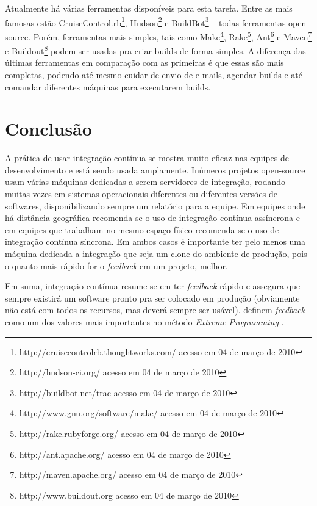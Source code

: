\documentclass[10pt,a4paper,font=plain]{abnt}
\begin{document}
Atualmente há várias ferramentas disponíveis para esta tarefa. Entre as mais famosas estão CruiseControl.rb\footnote{http://cruisecontrolrb.thoughtworks.com/ acesso em 04 de março de 2010}, Hudson\footnote{http://hudson-ci.org/ acesso em 04 de março de 2010} e BuildBot\footnote{http://buildbot.net/trac acesso em 04 de março de 2010} -- todas ferramentas open-source. Porém, ferramentas mais simples, tais como Make\footnote{http://www.gnu.org/software/make/ acesso em 04 de março de 2010}, Rake\footnote{ http://rake.rubyforge.org/ acesso em 04 de março de 2010}, Ant\footnote{http://ant.apache.org/ acesso em 04 de março de 2010} e Maven\footnote{http://maven.apache.org/ acesso em 04 de março de 2010} e Buildout\footnote{http://www.buildout.org acesso em 04 de março de 2010} podem ser usadas pra criar builds de forma simples. A diferença das últimas ferramentas em comparação com as primeiras é que essas são mais completas, podendo até mesmo cuidar de envio de e-mails, agendar builds e até comandar diferentes máquinas para executarem builds.

\section{Conclusão}

A prática de usar integração contínua se mostra muito eficaz nas equipes de desenvolvimento e está sendo usada amplamente. Inúmeros projetos open-source usam várias máquinas dedicadas a serem servidores de integração, rodando muitas vezes em sistemas operacionais diferentes ou diferentes versões de softwares, disponibilizando sempre um relatório para a equipe. Em equipes onde há distância geográfica recomenda-se o uso de integração contínua assíncrona e em equipes que trabalham no mesmo espaço físico recomenda-se o uso de integração contínua síncrona. Em ambos casos é importante ter pelo menos uma máquina dedicada a integração que seja um clone do ambiente de produção, pois o quanto mais rápido for o \textit{feedback} em um projeto, melhor.

Em suma, integração contínua resume-se em ter \textit{feedback} rápido e assegura que sempre existirá um software pronto pra ser colocado em produção (obviamente não está com todos os recursos, mas deverá sempre ser usável).  definem \textit{feedback} como um dos valores mais importantes no método \textit{Extreme Programming} \cite{XP}.


\end{document}

